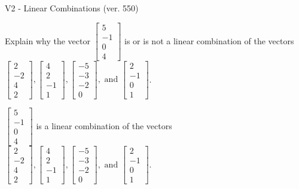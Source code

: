 \begin{exercise}
  \begin{exerciseTitle}V2 - Linear Combinations (ver. 550)\end{exerciseTitle}
  \begin{exerciseStatement}
    Explain why the vector \(\left[\begin{array}{c}
5 \\
-1 \\
0 \\
4
\end{array}\right]\)  is or is not a linear 
	combination of the vectors \(\left[\begin{array}{c}
2 \\
-2 \\
4 \\
2
\end{array}\right] , \left[\begin{array}{c}
4 \\
2 \\
-1 \\
1
\end{array}\right] , \left[\begin{array}{c}
-5 \\
-3 \\
-2 \\
0
\end{array}\right] , \text{ and } \left[\begin{array}{c}
2 \\
-1 \\
0 \\
1
\end{array}\right]\).
	


  \end{exerciseStatement}
  \begin{exerciseAnswer}
   \(\left[\begin{array}{c}
5 \\
-1 \\
0 \\
4
\end{array}\right]\) 
  	 is  
	a linear combination of the vectors \(\left[\begin{array}{c}
2 \\
-2 \\
4 \\
2
\end{array}\right] , \left[\begin{array}{c}
4 \\
2 \\
-1 \\
1
\end{array}\right] , \left[\begin{array}{c}
-5 \\
-3 \\
-2 \\
0
\end{array}\right] , \text{ and } \left[\begin{array}{c}
2 \\
-1 \\
0 \\
1
\end{array}\right]\).


\end{exerciseAnswer}
\end{exercise}
